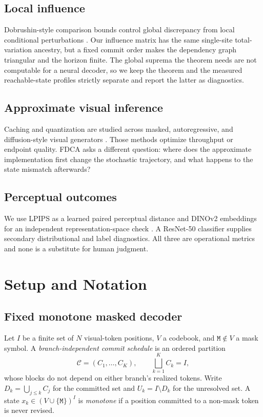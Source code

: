 \documentclass[11pt,a4paper]{article}
\theoremstyle{plain}
\theoremstyle{definition}
\theoremstyle{remark}
\newcommand{\Mask}{\texttt{M}}
\begin{document}
\subsection{Local influence}
Dobrushin-style comparison bounds control global discrepancy from local
conditional perturbations \citep{rebeschini2014comparison}. Our influence matrix
has the same single-site total-variation ancestry, but a fixed commit order makes
the dependency graph triangular and the horizon finite. The global suprema the
theorem needs are not computable for a neural decoder, so we keep the theorem and
the measured reachable-state profiles strictly separate and report the latter as
diagnostics.

\subsection{Approximate visual inference}
Caching and quantization are studied across masked, autoregressive, and
diffusion-style visual generators
\citep{yan2025lazymar,wu2025quantcache,moon2026shift}. Those methods optimize
throughput or endpoint quality. FDCA asks a different question: where does the
approximate implementation first change the stochastic trajectory, and what
happens to the state mismatch afterwards?

\subsection{Perceptual outcomes}
We use LPIPS as a learned paired perceptual distance
\citep{zhang2018unreasonable} and DINOv2 embeddings for an independent
representation-space check \citep{oquab2024dinov2}. A ResNet-50 classifier
\citep{he2016deep} supplies secondary distributional and label diagnostics. All
three are operational metrics and none is a substitute for human judgment.

\section{Setup and Notation}
\label{sec:setup}

\subsection{Fixed monotone masked decoder}
Let $I$ be a finite set of $N$ visual-token positions, $V$ a codebook, and
$\Mask \notin V$ a mask symbol. A \emph{branch-independent commit schedule} is an
ordered partition
\[
  \mathcal{C} = (C_1,\dots,C_K), \qquad \bigsqcup_{k=1}^{K} C_k = I ,
\]
whose blocks do not depend on either branch's realized tokens. Write
$D_k = \bigcup_{j\le k} C_j$ for the committed set and $U_k = I \setminus D_k$ for
the unresolved set. A state $x_k \in (V\cup\{\Mask\})^I$ is \emph{monotone} if a
position committed to a non-mask token is never revised.
\end{document}
